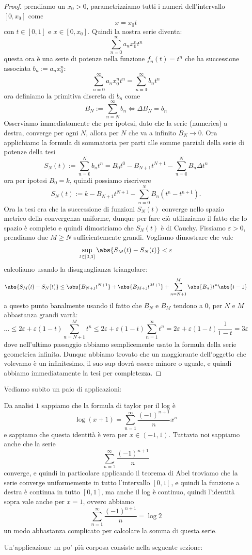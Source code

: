 \documentclass[11pt]{scrartcl}
\begin{document}
	 \begin{proof}
	 	prendiamo un $x_0>0$, parametrizziamo tutti i numeri dell'intervallo $[0,x_0]$ come 
	 	$$x=x_0t$$
	 	con $t\in[0,1]$ e $x\in [0,x_0]$. Quindi la nostra serie diventa:
	 	$$\sum_{n=0}^{\infty}a_nx_0^n t^n$$
	 	questa ora è una serie di potenze nella funzione $f_n(t)=t^n$ che ha successione associata $b_n:=a_nx_0^n$:
	 	$$\sum_{n=0}^{\infty}a_nx_0^n t^n=\sum_{n=0}^{\infty}b_nt^n$$
	 	ora definiamo la primitiva discreta di $b_n$ come
	 	$$B_N:=\sum_{n=N}^{\infty}b_n \iff \Delta B_N = b_n$$
	 	Osserviamo immediatamente che per ipotesi, dato che la serie (numerica) a destra, converge per ogni $N$, allora per $N$ che va a infinito $B_N\to 0$. 
	 	Ora applichiamo la formula di sommatoria per parti alle somme parziali della serie di potenze della tesi
	 	$$S_N(t):=\sum_{n=0}^{N}b_nt^n=B_0t^0-B_{N+1}t^{N+1}-\sum_{n=0}^{N}B_n\Delta t^n$$
	 	ora per ipotesi $B_0=k$, quindi possiamo riscrivere
	 	$$S_N(t):=k-B_{N+1}t^{N+1}-\sum_{n=0}^{N}B_n\left(t^n-t^{n+1}\right).$$
	 	Ora la tesi era che la successione di funzioni $S_N(t)$ converge nello spazio metrico della convergenza uniforme, dunque per fare ciò utilizziamo il fatto che lo spazio è completo e quindi dimostriamo che $S_N(t)$ è di Cauchy. Fissiamo $\varepsilon>0$, prendiamo due $M\ge N$ sufficientemente grandi. Vogliamo dimostrare che vale
	 	$$\sup_{t\in[0,1]}\abs{S_M(t)-S_N(t)}<\varepsilon$$
	 	calcoliamo usando la disuguaglianza triangolare:
	 	$$\abs{S_M(t)-S_N(t)}\le \abs{B_{N+1}t^{N+1}}+\abs{B_{M+1}t^{M+1}}+\sum_{n=N+1}^M\abs{B_n}t^{n}\abs{t-1}$$
	 	a questo punto banalmente usando il fatto che $B_N$ e $B_M$ tendono a $0$, per $N$ e $M$ abbastanza grandi varrà:
	 	$$\dots\le 2\varepsilon+\varepsilon(1-t)\sum_{n=N+1}^Mt^n\le 2\varepsilon +\varepsilon(1-t)\sum_{n=1}^{\infty}t^n=2\varepsilon+\varepsilon(1-t)\frac{1}{1-t}=3\varepsilon$$
	 	dove nell'ultimo passaggio abbiamo semplicemente usato la formula della serie geometrica infinita. Dunque abbiamo trovato che un maggiorante dell'oggetto che volevamo è un infinitesimo, il suo sup dovrà essere minore o uguale, e quindi abbiamo immediatamente la tesi per completezza.
	 \end{proof}
	 Vediamo subito un paio di applicazioni:
	 \begin{example}
	 	Da analisi $1$ sappiamo che la formula di taylor per il log è
	 	$$\log(x+1)=\sum_{n=1}^{\infty}\frac{(-1)^{n+1}}{n}x^n$$
	 	e sappiamo che questa identità è vera per $x\in (-1,1)$. Tuttavia noi sappiamo anche che la serie
	 	$$\sum_{n=1}^{\infty}\frac{(-1)^{n+1}}{n}$$
	 	converge, e quindi in particolare applicando il teorema di Abel troviamo che la serie converge uniformemente in tutto l'intervallo $[0,1]$, e quindi la funzione a destra è continua in tutto $[0,1]$, ma anche il log è continuo, quindi l'identità sopra vale anche per $x=1$, ovvero abbiamo
	 	$$\sum_{n=1}^{\infty}\frac{(-1)^{n+1}}{n}=\log 2$$
	 	un modo abbastanza complicato per calcolare la somma di questa serie.
	 \end{example}
	 Un'applicazione un po' più corposa consiste nella seguente sezione:
\end{document}
